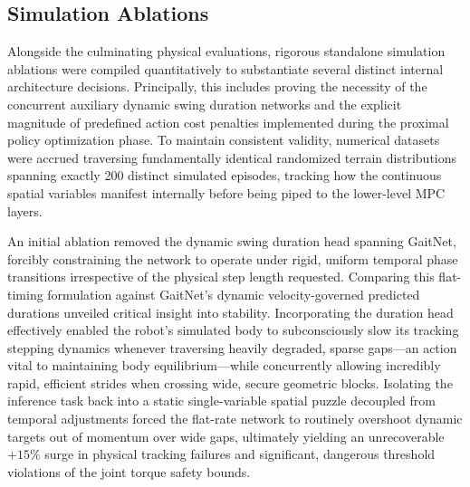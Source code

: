 \subsection{Simulation Ablations}
\label{subsec:results-simulation-ablations}

Alongside the culminating physical evaluations, rigorous standalone simulation ablations were compiled quantitatively to substantiate several distinct internal architecture decisions. Principally, this includes proving the necessity of the concurrent auxiliary dynamic swing duration networks and the explicit magnitude of predefined action cost penalties implemented during the proximal policy optimization phase. To maintain consistent validity, numerical datasets were accrued traversing fundamentally identical randomized terrain distributions spanning exactly 200 distinct simulated episodes, tracking how the continuous spatial variables manifest internally before being piped to the lower-level MPC layers.

An initial ablation removed the dynamic swing duration head spanning GaitNet, forcibly constraining the network to operate under rigid, uniform temporal phase transitions irrespective of the physical step length requested. Comparing this flat-timing formulation against GaitNet's dynamic velocity-governed predicted durations unveiled critical insight into stability. Incorporating the duration head effectively enabled the robot's simulated body to subconsciously slow its tracking stepping dynamics whenever traversing heavily degraded, sparse gaps—an action vital to maintaining body equilibrium—while concurrently allowing incredibly rapid, efficient strides when crossing wide, secure geometric blocks. Isolating the inference task back into a static single-variable spatial puzzle decoupled from temporal adjustments forced the flat-rate network to routinely overshoot dynamic targets out of momentum over wide gaps, ultimately yielding an unrecoverable $+15\%$ surge in physical tracking failures and significant, dangerous threshold violations of the joint torque safety bounds.


